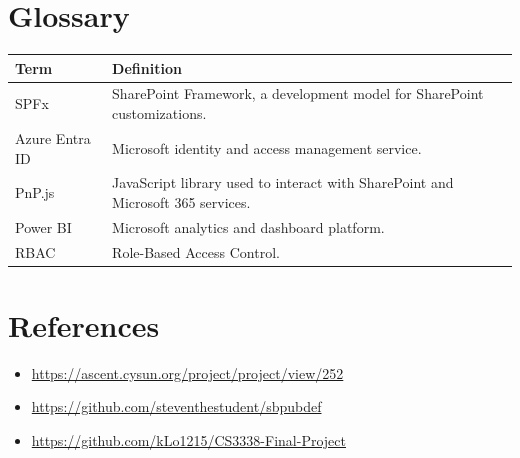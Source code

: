 \documentclass[12pt]{article}
\begin{document}
\section{Glossary}
\begin{longtable}{|p{1.4in}|p{4.6in}|}\hline
Term & Definition \\ \hline
SPFx & SharePoint Framework, a development model for SharePoint customizations. \\ \hline
Azure Entra ID & Microsoft identity and access management service. \\ \hline
PnP.js & JavaScript library used to interact with SharePoint and Microsoft 365 services. \\ \hline
Power BI & Microsoft analytics and dashboard platform. \\ \hline
RBAC & Role-Based Access Control. \\ \hline
\end{longtable}

\section{References}
\begin{itemize}
\item \url{https://ascent.cysun.org/project/project/view/252}
\item \url{https://github.com/steventhestudent/sbpubdef}
\item \url{https://github.com/kLo1215/CS3338-Final-Project}
\end{itemize}
\end{document}
